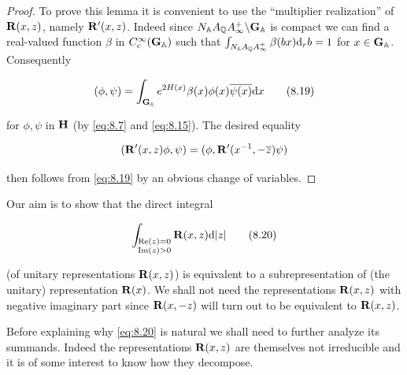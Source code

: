 \begin{proof}

To prove this lemma it is convenient to use the ``multiplier realization'' of $\mathbf{R}(x,z)$, namely $\mathbf{R}'(x,z)$. Indeed since $N_{\mathbb{A}}A_{\mathbb{Q}}A_{\infty}^{+}\backslash\mathbf{G}_{\mathbb{A}}$ is compact we can find a real-valued function $\beta$ in $C_{c}^{\infty}(\mathbf{G}_{\mathbb{A}})$ such that $\int_{N_{\mathbb{A}}A_{\mathbb{Q}}A_{\infty}^{+}}\beta(bx)\mathrm{d}_{r}b = 1$ for $x \in \mathbf{G}_{\mathbb{A}}$. Consequently

\begin{equation}\label{eq:8.19}
(\phi, \psi) = \int_{\mathbf{G}_{\mathbb{A}}} e^{2H(x)}\beta(x)\phi(x)\overline{\psi(x)} \mathrm{d} x\tag{8.19}
\end{equation}

for $\phi, \psi$ in $\mathbf{H}$ (by \eqref{eq:8.7} and \eqref{eq:8.15}). The desired equality

\[
(\mathbf{R}'(x,z)\phi, \psi) = (\phi, \mathbf{R}'(x^{-1}, -\overline{z})\psi)
\]

then follows from \eqref{eq:8.19} by an obvious change of variables.

\end{proof}

Our aim is to show that the direct integral

\begin{equation}\label{eq:8.20}
\int_{\substack{\operatorname{Re}(z) = 0 \\ \operatorname{Im}(z) > 0}} \mathbf{R}(x,z) \mathrm{d}|z|\tag{8.20}
\end{equation}

(of unitary representations $\mathbf{R}(x,z)$) is equivalent to a subrepresentation of (the unitary) representation $\mathbf{R}(x)$. We shall not need the representations $\mathbf{R}(x,z)$ with negative imaginary part since $\mathbf{R}(x,-z)$ will turn out to be equivalent to $\mathbf{R}(x,z)$.

Before explaining why \eqref{eq:8.20} is natural we shall need to further analyze its summands. Indeed the representations $\mathbf{R}(x,z)$ are themselves not irreducible and it is of some interest to know how they decompose.

